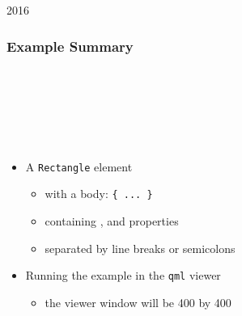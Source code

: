 \begin{slide}{2016}\frametitle{Example Summary}

\begin{qml}
\\
\vspace*{0.5em}
\\
\vspace*{0.5em}
\\
\\
\\
\qtt{\}}
\end{qml}

\vspace*{1em}
\begin{itemize}
\item A \texttt{\textcolor{class}{Rectangle}} element
  \begin{itemize}
  \item with a body: \texttt{\{ ... \}}
  \item containing ,  and 
  properties
  \item separated by line breaks or semicolons
  \end{itemize}
\item Running the example in the \texttt{qml} viewer
  \begin{itemize}
  \item the viewer window will be 400 by 400
  \end{itemize}
\end{itemize}

\end{slide}


